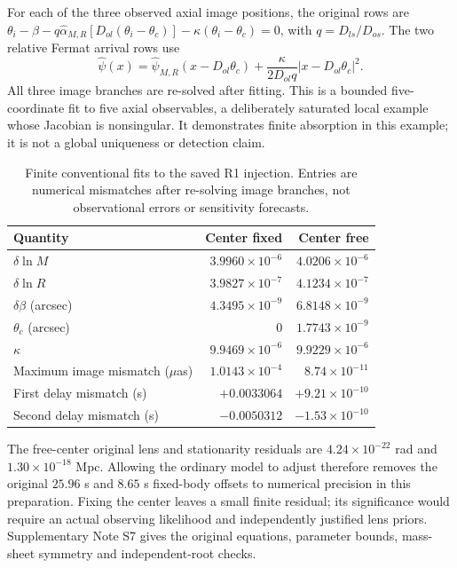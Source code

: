 For each of the three observed axial image positions, the original rows
are $\theta_i-\beta-q\hat\alpha_{M,R}[D_{ol}(\theta_i-\theta_c)]
-\kappa(\theta_i-\theta_c)=0$, with $q=D_{ls}/D_{os}$.
The two relative Fermat arrival rows use
\begin{equation}
 \hat\psi(x)=\hat\psi_{M,R}(x-D_{ol}\theta_c)
 +\frac{\kappa}{2D_{ol}q}|x-D_{ol}\theta_c|^2.
 \label{eq:finite-refit}
\end{equation}
All three image branches are re-solved after fitting. This is a bounded
five-coordinate fit to five axial observables, a deliberately saturated
local example whose Jacobian is nonsingular. It demonstrates finite
absorption in this example; it is not a global uniqueness or detection
claim.
\begin{table}[htbp]
 \centering
 \caption{Finite conventional fits to the saved R1 injection.
 Entries are numerical mismatches after re-solving image branches,
 not observational errors or sensitivity forecasts.}
 \label{tab:finite-refit}
 \begin{tabular}{lrr}
 \toprule
 Quantity & Center fixed & Center free\\
 \midrule
 $\delta\ln M$ & $3.9960\times10^{-6}$ & $4.0206\times10^{-6}$\\
 $\delta\ln R$ & $3.9827\times10^{-7}$ & $4.1234\times10^{-7}$\\
 $\delta\beta$ (arcsec) & $4.3495\times10^{-9}$ & $6.8148\times10^{-9}$\\
 $\theta_c$ (arcsec) & $0$ & $1.7743\times10^{-9}$\\
 $\kappa$ & $9.9469\times10^{-6}$ & $9.9229\times10^{-6}$\\
 Maximum image mismatch ($\mu$as) & $1.0143\times10^{-4}$ & $8.74\times10^{-11}$\\
 First delay mismatch (s) & $+0.0033064$ & $+9.21\times10^{-10}$\\
 Second delay mismatch (s) & $-0.0050312$ & $-1.53\times10^{-10}$\\
 \bottomrule
 \end{tabular}
\end{table}
The free-center original lens and stationarity residuals are
$4.24\times10^{-22}$ rad and $1.30\times10^{-18}$ Mpc. Allowing the
ordinary model to adjust therefore removes the original $25.96$ s and
$8.65$ s fixed-body offsets to numerical precision in this preparation.
Fixing the center leaves a small finite residual; its significance
would require an actual observing likelihood and independently justified
lens priors. Supplementary Note S7 gives the original equations,
parameter bounds, mass-sheet symmetry and independent-root checks.

